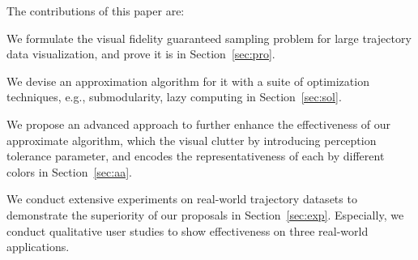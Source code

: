 The contributions of this paper are:
\squishlist
  \item We formulate the visual fidelity guaranteed sampling problem for large trajectory data visualization, and prove it is  in Section~\ref{sec:pro}.
  \item We devise an approximation algorithm for it with a suite of optimization techniques, e.g., submodularity, lazy computing in Section~\ref{sec:sol}.
  \item We propose an advanced approach to further enhance the effectiveness of our approximate algorithm, which  the visual clutter by introducing perception tolerance parameter,
  and encodes the representativeness of each  by different colors in Section~\ref{sec:aa}.
  \item We conduct extensive experiments on real-world trajectory datasets to demonstrate the superiority of our proposals in Section~\ref{sec:exp}. Especially, we conduct qualitative user studies to show   effectiveness on three real-world applications.
\squishend



%


